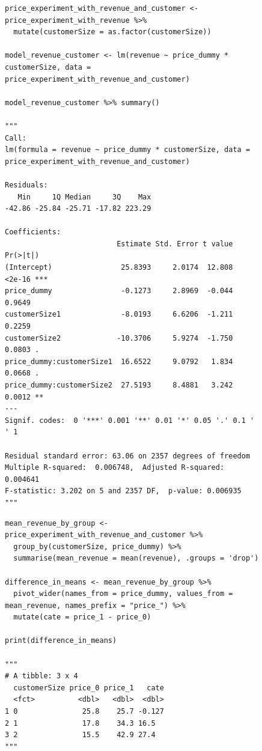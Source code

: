 \documentclass{article}
\begin{document}
\begin{figure}[H]
\centering
\begin{lstlisting}[style=Rstyle, caption=Revenue Effect on Different Firm Sizes]
price_experiment_with_revenue_and_customer <- price_experiment_with_revenue %>% 
  mutate(customerSize = as.factor(customerSize))

model_revenue_customer <- lm(revenue ~ price_dummy * customerSize, data = price_experiment_with_revenue_and_customer)

model_revenue_customer %>% summary()

"""
Call:
lm(formula = revenue ~ price_dummy * customerSize, data = price_experiment_with_revenue_and_customer)

Residuals:
   Min     1Q Median     3Q    Max 
-42.86 -25.84 -25.71 -17.82 223.29 

Coefficients:
                          Estimate Std. Error t value Pr(>|t|)    
(Intercept)                25.8393     2.0174  12.808   <2e-16 ***
price_dummy                -0.1273     2.8969  -0.044   0.9649    
customerSize1              -8.0193     6.6206  -1.211   0.2259    
customerSize2             -10.3706     5.9274  -1.750   0.0803 .  
price_dummy:customerSize1  16.6522     9.0792   1.834   0.0668 .  
price_dummy:customerSize2  27.5193     8.4881   3.242   0.0012 ** 
---
Signif. codes:  0 '***' 0.001 '**' 0.01 '*' 0.05 '.' 0.1 ' ' 1

Residual standard error: 63.06 on 2357 degrees of freedom
Multiple R-squared:  0.006748,	Adjusted R-squared:  0.004641 
F-statistic: 3.202 on 5 and 2357 DF,  p-value: 0.006935
"""
\end{lstlisting}
\end{figure}

\begin{figure}[H]
\centering
\begin{lstlisting}[style=Rstyle, caption=Difference in Means by Customer Size]
mean_revenue_by_group <- price_experiment_with_revenue_and_customer %>%
  group_by(customerSize, price_dummy) %>%
  summarise(mean_revenue = mean(revenue), .groups = 'drop')

difference_in_means <- mean_revenue_by_group %>%
  pivot_wider(names_from = price_dummy, values_from = mean_revenue, names_prefix = "price_") %>%
  mutate(cate = price_1 - price_0)

print(difference_in_means)

"""
# A tibble: 3 x 4
  customerSize price_0 price_1   cate
  <fct>          <dbl>   <dbl>  <dbl>
1 0               25.8    25.7 -0.127
2 1               17.8    34.3 16.5  
3 2               15.5    42.9 27.4
"""
\end{lstlisting}
\end{figure}
\end{document}
